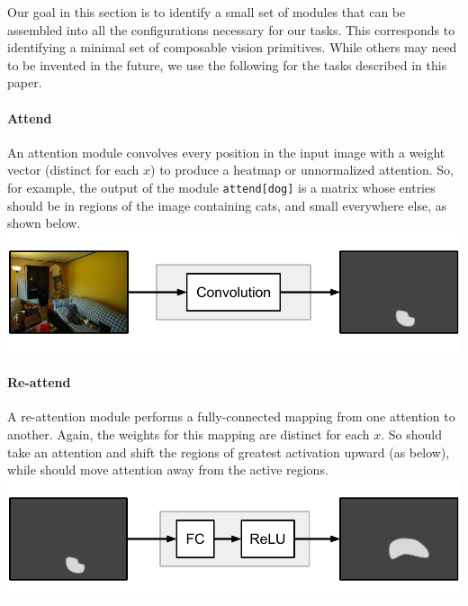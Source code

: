 \documentclass[10pt,twocolumn,letterpaper]{article}
\begin{document}
Our goal in this section is to identify a small set of modules that can be
assembled into all the configurations necessary for our tasks. This corresponds
to identifying a minimal set of composable vision primitives. While others  may
need to be invented in the future, we use the following for the tasks described
in this paper.\\

\paragraph{Attend}

An attention module  convolves every position in the input image with a weight vector (distinct for each $x$) to produce a heatmap or unnormalized attention. So, for example, the output of the module {\small\tt attend[dog]} is a matrix whose entries should be in regions of the image containing cats, and small everywhere else, as shown below.\\[1em]
\includegraphics[width=\columnwidth]{fig/attend}

\paragraph{Re-attend}

A re-attention module  performs a fully-connected mapping from one attention to another. Again, the weights for this mapping are distinct for each $x$. So  should take an attention and shift the regions of greatest activation upward (as below), while  should move attention away from the active regions.\\[1em]
\includegraphics[width=\columnwidth]{fig/re-attend}
\end{document}
